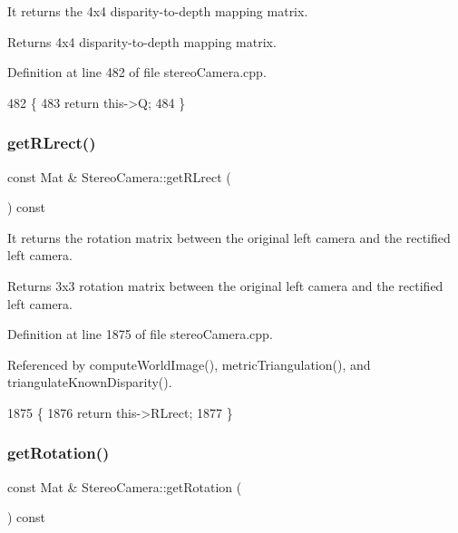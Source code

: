 It returns the 4x4 disparity-\/to-\/depth mapping matrix. 

\begin{DoxyReturn}{Returns}
4x4 disparity-\/to-\/depth mapping matrix. 
\end{DoxyReturn}


Definition at line 482 of file stereo\+Camera.\+cpp.


\begin{DoxyCode}
482                                     \{
483     \textcolor{keywordflow}{return} this->Q;
484 \}
\end{DoxyCode}
\mbox{\label{classStereoCamera_ab3adb747963c617fd2fe1a919b0c59c7}} 
\subsubsection{\texorpdfstring{get\+R\+Lrect()}{getRLrect()}}
{\footnotesize\ttfamily const Mat \& Stereo\+Camera\+::get\+R\+Lrect (\begin{DoxyParamCaption}{ }\end{DoxyParamCaption}) const}



It returns the rotation matrix between the original left camera and the rectified left camera. 

\begin{DoxyReturn}{Returns}
3x3 rotation matrix between the original left camera and the rectified left camera. 
\end{DoxyReturn}


Definition at line 1875 of file stereo\+Camera.\+cpp.



Referenced by compute\+World\+Image(), metric\+Triangulation(), and triangulate\+Known\+Disparity().


\begin{DoxyCode}
1875                                          \{
1876     \textcolor{keywordflow}{return} this->RLrect;
1877 \}
\end{DoxyCode}
\mbox{\label{classStereoCamera_a08b520f9976fc3213047844fedc02a54}} 
\subsubsection{\texorpdfstring{get\+Rotation()}{getRotation()}}
{\footnotesize\ttfamily const Mat \& Stereo\+Camera\+::get\+Rotation (\begin{DoxyParamCaption}{ }\end{DoxyParamCaption}) const}




